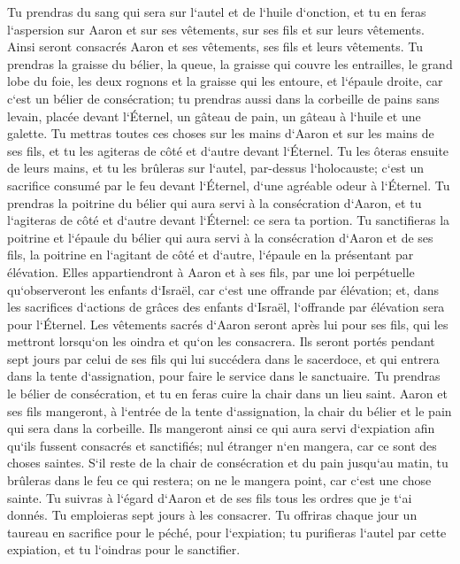 \verse Tu prendras du sang qui sera sur l`autel et de l`huile d`onction, et tu en feras l`aspersion sur Aaron et sur ses vêtements, sur ses fils et sur leurs vêtements. Ainsi seront consacrés Aaron et ses vêtements, ses fils et leurs vêtements. 
\verse Tu prendras la graisse du bélier, la queue, la graisse qui couvre les entrailles, le grand lobe du foie, les deux rognons et la graisse qui les entoure, et l`épaule droite, car c`est un bélier de consécration; 
\verse tu prendras aussi dans la corbeille de pains sans levain, placée devant l`Éternel, un gâteau de pain, un gâteau à l`huile et une galette. 
\verse Tu mettras toutes ces choses sur les mains d`Aaron et sur les mains de ses fils, et tu les agiteras de côté et d`autre devant l`Éternel. 
\verse Tu les ôteras ensuite de leurs mains, et tu les brûleras sur l`autel, par-dessus l`holocauste; c`est un sacrifice consumé par le feu devant l`Éternel, d`une agréable odeur à l`Éternel. 
\verse Tu prendras la poitrine du bélier qui aura servi à la consécration d`Aaron, et tu l`agiteras de côté et d`autre devant l`Éternel: ce sera ta portion. 
\verse Tu sanctifieras la poitrine et l`épaule du bélier qui aura servi à la consécration d`Aaron et de ses fils, la poitrine en l`agitant de côté et d`autre, l`épaule en la présentant par élévation. 
\verse Elles appartiendront à Aaron et à ses fils, par une loi perpétuelle qu`observeront les enfants d`Israël, car c`est une offrande par élévation; et, dans les sacrifices d`actions de grâces des enfants d`Israël, l`offrande par élévation sera pour l`Éternel. 
\verse Les vêtements sacrés d`Aaron seront après lui pour ses fils, qui les mettront lorsqu`on les oindra et qu`on les consacrera. 
\verse Ils seront portés pendant sept jours par celui de ses fils qui lui succédera dans le sacerdoce, et qui entrera dans la tente d`assignation, pour faire le service dans le sanctuaire. 
\verse Tu prendras le bélier de consécration, et tu en feras cuire la chair dans un lieu saint. 
\verse Aaron et ses fils mangeront, à l`entrée de la tente d`assignation, la chair du bélier et le pain qui sera dans la corbeille. 
\verse Ils mangeront ainsi ce qui aura servi d`expiation afin qu`ils fussent consacrés et sanctifiés; nul étranger n`en mangera, car ce sont des choses saintes. 
\verse S`il reste de la chair de consécration et du pain jusqu`au matin, tu brûleras dans le feu ce qui restera; on ne le mangera point, car c`est une chose sainte. 
\verse Tu suivras à l`égard d`Aaron et de ses fils tous les ordres que je t`ai donnés. Tu emploieras sept jours à les consacrer. 
\verse Tu offriras chaque jour un taureau en sacrifice pour le péché, pour l`expiation; tu purifieras l`autel par cette expiation, et tu l`oindras pour le sanctifier. 
